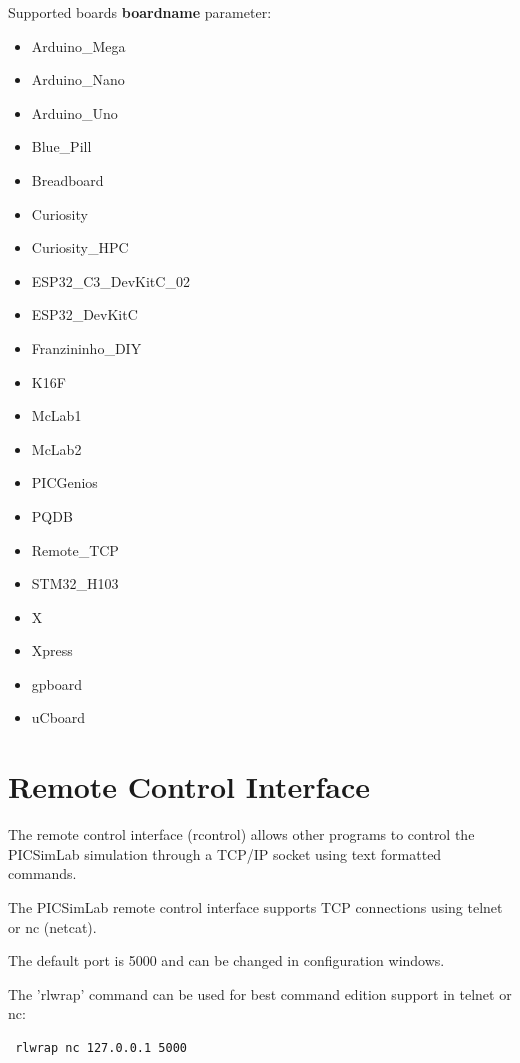 Supported boards \textbf{boardname} parameter:
\begin{itemize}
 \item Arduino\_Mega
 \item Arduino\_Nano
 \item Arduino\_Uno
 \item Blue\_Pill
 \item Breadboard
 \item Curiosity
 \item Curiosity\_HPC
 \item ESP32\_C3\_DevKitC\_02
 \item ESP32\_DevKitC
 \item Franzininho\_DIY
 \item K16F
 \item McLab1
 \item McLab2
 \item PICGenios
 \item PQDB
 \item Remote\_TCP
 \item STM32\_H103
 \item X
 \item Xpress
 \item gpboard
 \item uCboard 
\end{itemize}



\section{Remote Control Interface}\hypertarget{def:rcontrol}{}

The remote control interface (rcontrol) allows other programs to control the PICSimLab simulation
through a TCP/IP socket using text formatted commands. 

The PICSimLab remote control interface supports TCP connections using telnet or nc (netcat).

The default port is 5000 and can be changed in configuration windows. 

The 'rlwrap' command can be used for best command edition support in telnet or nc:
\begin{verbatim}
 rlwrap nc 127.0.0.1 5000
\end{verbatim}
  
